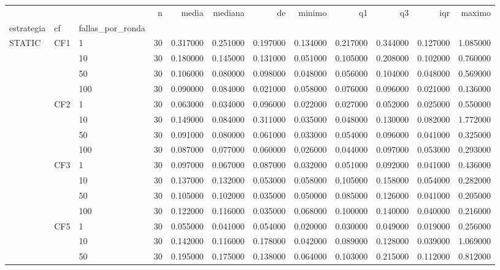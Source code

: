 \begin{tabular}{lllrrrrrrrrr}
\toprule
 &  &  & n & media & mediana & de & minimo & q1 & q3 & iqr & maximo \\
estrategia & cf & fallas_por_ronda &  &  &  &  &  &  &  &  &  \\
\midrule
\multirow[t]{16}{*}{STATIC} & \multirow[t]{4}{*}{CF1} & 1 & 30 & 0.317000 & 0.251000 & 0.197000 & 0.134000 & 0.217000 & 0.344000 & 0.127000 & 1.085000 \\
 &  & 10 & 30 & 0.180000 & 0.145000 & 0.131000 & 0.051000 & 0.105000 & 0.208000 & 0.102000 & 0.760000 \\
 &  & 50 & 30 & 0.106000 & 0.080000 & 0.098000 & 0.048000 & 0.056000 & 0.104000 & 0.048000 & 0.569000 \\
 &  & 100 & 30 & 0.090000 & 0.084000 & 0.021000 & 0.058000 & 0.076000 & 0.096000 & 0.021000 & 0.136000 \\
\cline{2-12}
 & \multirow[t]{4}{*}{CF2} & 1 & 30 & 0.063000 & 0.034000 & 0.096000 & 0.022000 & 0.027000 & 0.052000 & 0.025000 & 0.550000 \\
 &  & 10 & 30 & 0.149000 & 0.084000 & 0.311000 & 0.035000 & 0.048000 & 0.130000 & 0.082000 & 1.772000 \\
 &  & 50 & 30 & 0.091000 & 0.080000 & 0.061000 & 0.033000 & 0.054000 & 0.096000 & 0.041000 & 0.325000 \\
 &  & 100 & 30 & 0.087000 & 0.077000 & 0.060000 & 0.026000 & 0.044000 & 0.097000 & 0.053000 & 0.293000 \\
\cline{2-12}
 & \multirow[t]{4}{*}{CF3} & 1 & 30 & 0.097000 & 0.067000 & 0.087000 & 0.032000 & 0.051000 & 0.092000 & 0.041000 & 0.436000 \\
 &  & 10 & 30 & 0.137000 & 0.132000 & 0.053000 & 0.058000 & 0.105000 & 0.158000 & 0.054000 & 0.282000 \\
 &  & 50 & 30 & 0.105000 & 0.102000 & 0.035000 & 0.050000 & 0.085000 & 0.126000 & 0.041000 & 0.205000 \\
 &  & 100 & 30 & 0.122000 & 0.116000 & 0.035000 & 0.068000 & 0.100000 & 0.140000 & 0.040000 & 0.216000 \\
\cline{2-12}
 & \multirow[t]{4}{*}{CF5} & 1 & 30 & 0.055000 & 0.041000 & 0.054000 & 0.020000 & 0.030000 & 0.049000 & 0.019000 & 0.256000 \\
 &  & 10 & 30 & 0.142000 & 0.116000 & 0.178000 & 0.042000 & 0.089000 & 0.128000 & 0.039000 & 1.069000 \\
 &  & 50 & 30 & 0.195000 & 0.175000 & 0.138000 & 0.064000 & 0.103000 & 0.215000 & 0.112000 & 0.812000 \\

\end{tabular}
